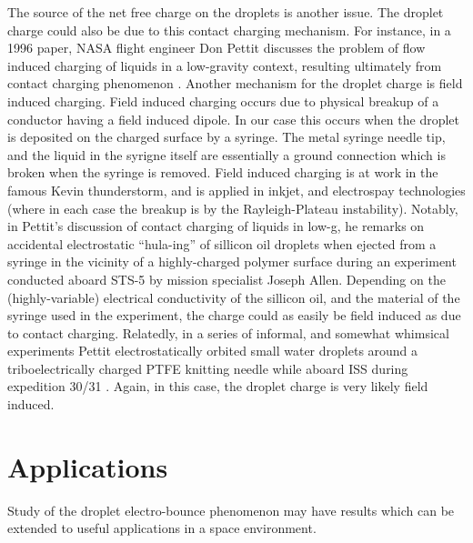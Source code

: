 \documentclass[12pt,a4paper,oneside]{book}
\begin{document}
The source of the net free charge on the droplets is another issue. The droplet charge could also be due to this contact charging mechanism. For instance, in a 1996 paper, NASA flight engineer Don Pettit discusses the problem of flow induced charging of liquids in a low-gravity context, resulting ultimately from contact charging phenomenon \cite{pettit_donald_flow_????}. Another mechanism for the droplet charge is field induced charging. Field induced charging occurs due to physical breakup of a conductor having a field induced dipole. In our case this occurs when the droplet is deposited on the charged surface by a syringe. The metal syringe needle tip, and the liquid in the syrigne itself are essentially a ground connection which is broken when the syringe is removed. Field induced charging is at work in the famous Kevin thunderstorm, and is applied in inkjet, and electrospay technologies (where in each case the breakup is by the Rayleigh-Plateau instability). Notably, in Pettit's discussion of contact charging of liquids in low-g, he remarks on accidental electrostatic ``hula-ing'' of sillicon oil droplets when ejected from a syringe in the vicinity of a highly-charged polymer surface during an experiment conducted aboard STS-5 by mission specialist Joseph Allen. Depending on the (highly-variable) electrical conductivity of the sillicon oil, and the material of the syringe used in the experiment, the charge could as easily be field induced as due to contact charging. Relatedly, in a series of informal, and somewhat whimsical experiments Pettit electrostatically orbited small water droplets around a triboelectrically charged PTFE knitting needle while aboard ISS during expedition 30/31 \cite{stevenson_electrostatic_2015}. Again, in this case, the droplet charge is very likely field induced.  

\section{Applications}
Study of the droplet electro-bounce phenomenon may have results which can be extended to useful applications in a space environment.
\end{document}
